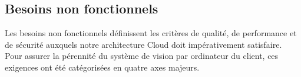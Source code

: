 



\subsection{Besoins non fonctionnels}
Les besoins non fonctionnels définissent les critères de qualité, de performance et de sécurité auxquels notre architecture Cloud doit impérativement satisfaire. Pour assurer la pérennité du système de vision par ordinateur du client, ces exigences ont été catégorisées en quatre axes majeurs.


